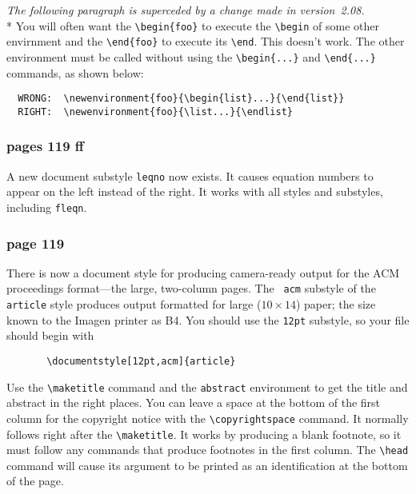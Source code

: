 \noindent
{\it The following paragraph is superceded by a change made in
version~2.08.}\\*
You will often want the \hbox{\verb"\begin{foo}"} to
execute the \hbox{\verb"\begin"} of some other envirnment and the
\hbox{\verb"\end{foo}"} to execute its \hbox{\verb"\end"}.  This
doesn't work.  The other environment must be called without using the
\hbox{\verb"\begin{...}"} and \hbox{\verb"\end{...}"} commands, as
shown below:
\begin{verbatim}
  WRONG:  \newenvironment{foo}{\begin{list}...}{\end{list}}
  RIGHT:  \newenvironment{foo}{\list...}{\endlist}
\end{verbatim}

\subsubsection*{pages 119 ff} 
A new document substyle {\tt leqno} now exists.  It causes equation
numbers to appear on the left instead of the right.  It works with
all styles and substyles, including {\tt fleqn}.

\subsubsection* {page 119}
There is now a document style for producing camera-ready output for
the ACM proceedings format---the large, two-column pages.  The {\tt
acm} substyle of the \hbox{\verb"article"} style produces output
formatted for large ($10\times14$) paper; the size known to the Imagen
printer as B4.  You should use the {\tt 12pt} substyle, so your
file should begin with
\begin{verbatim}
       \documentstyle[12pt,acm]{article}
\end{verbatim}
Use the \hbox{\verb"\maketitle"} command and the \hbox{\verb"abstract"}
environment to get the title and abstract in the right places.
You can leave a space at the bottom of the first column for the
copyright notice with the \hbox{\verb"\copyrightspace"} command.  It
normally follows right after the \hbox{\verb"\maketitle"}.  It works
by producing a blank footnote, so it must follow any commands that
produce footnotes in the first column.  The \hbox{\verb"\head"}
command will cause its argument to be printed as an identification at
the bottom of the page.

